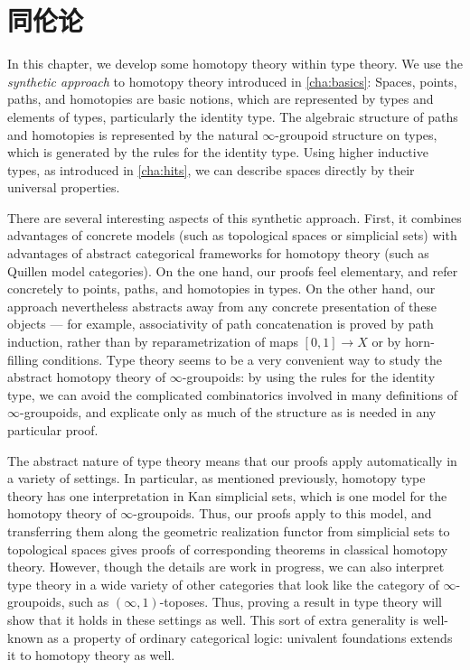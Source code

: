 \chapter{同伦论}
\label{cha:homotopy}


In this chapter, we develop some homotopy theory within type theory.  We
use the \emph{synthetic approach} to homotopy theory introduced in
\cref{cha:basics}: Spaces, points, paths, and homotopies are basic
notions, which are represented by types and elements of types, particularly
the identity type.  The algebraic structure of paths and homotopies is
represented by the natural $\infty$-groupoid
%
structure on types, which is generated
by the rules for the identity type.  Using higher inductive types, as
introduced in \cref{cha:hits}, we can describe spaces directly by their
universal properties.

%
There are several interesting aspects of this synthetic approach.
First, it combines advantages of concrete models (such as topological
spaces
or simplicial sets)
with advantages of abstract categorical frameworks
for homotopy theory (such as Quillen model categories).
 On the one hand,
our proofs feel elementary, and refer concretely to
points, paths, and homotopies in types.  On the other hand, our approach nevertheless abstracts away from
any concrete presentation of these objects --- for example,
associativity of path concatenation is proved by path induction, rather
than by reparametrization of maps $[0,1] \to X$ or by horn-filling conditions.
Type theory seems to be a very convenient way to study the abstract homotopy theory
of $\infty$-groupoids: by using the rules for the identity type, we
can avoid the complicated combinatorics involved in many definitions of
$\infty$-groupoids, and explicate only as much of the
structure as is needed in any particular proof.

The abstract nature of type theory means that our proofs apply automatically in a variety of settings.
In particular, as mentioned previously, homotopy type theory has one interpretation in
Kan simplicial sets,
which is one model for the homotopy theory of $\infty$-groupoids.  Thus,
our proofs apply to this model, and transferring them along the geometric
realization functor from simplicial sets to topological spaces gives
proofs of corresponding theorems in classical homotopy theory.
However, though the details are work in progress, we can also
interpret type theory in a wide variety of other categories
that look like the category of $\infty$-groupoids, such as
$(\infty,1)$-toposes.
Thus, proving a result in type theory will show
that it holds in these settings as well.
This sort of extra generality is well-known as a property of ordinary categorical logic:
univalent foundations extends it to homotopy theory as well.

